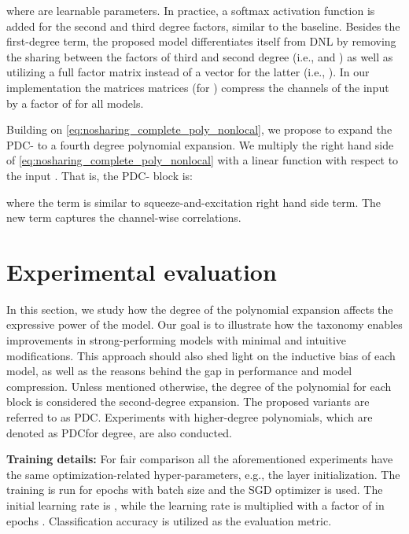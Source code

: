\documentclass[runningheads]{llncs}
\newcommand{\noshare}{PDC}
\providecommand\eg{e.g.,}
\begin{document}
where  are learnable parameters. In practice, a softmax activation function is added for the second and third degree factors, similar to the baseline. Besides the first-degree term, the proposed model differentiates itself from DNL by removing the sharing between the factors of third and second degree (i.e.,  and ) as well as utilizing a full factor matrix instead of a vector for the latter (i.e., ).
In our implementation the matrices  matrices (for ) compress the channels of the input by a factor of  for all models. 

Building on \eqref{eq:nosharing_complete_poly_nonlocal}, we propose to expand the \noshare- to a fourth degree polynomial expansion. We multiply the right hand side of \eqref{eq:nosharing_complete_poly_nonlocal} with a linear function with respect to the input . That is, the \noshare- block is:

where the term  is similar to squeeze-and-excitation right hand side term. The new term captures the channel-wise correlations. 











 \section{Experimental evaluation}
\label{sec:nosharing_experiments}

In this section, we study how the degree of the polynomial expansion affects the expressive power of the model.
Our goal is to illustrate how the taxonomy enables improvements in strong-performing models with minimal and intuitive modifications. This approach should also shed light on the inductive bias of each model, as well as the reasons behind the gap in performance and model compression.
Unless mentioned otherwise, the degree of the polynomial for each block is considered the second-degree expansion. The proposed variants are referred to as \noshare. 
Experiments with higher-degree polynomials, which are denoted as \noshare for  degree, are also conducted.


\noindent\textbf{Training details:} For fair comparison all the aforementioned experiments have the same optimization-related hyper-parameters, \eg{} the layer initialization. The training is run for  epochs with batch size  and the SGD optimizer is used. The initial learning rate is , while the learning rate is multiplied with a factor of  in epochs . 
Classification accuracy is utilized as the evaluation metric. 
\end{document}
